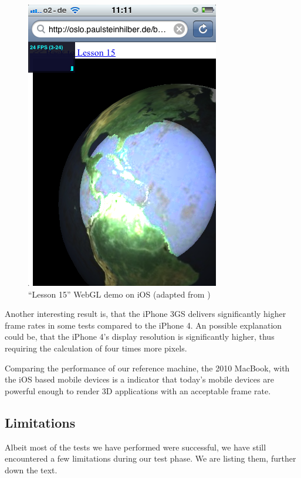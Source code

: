 \documentclass[12pt,journal,compsoc]{IEEEtran}
\begin{document}
\begin{figure}[htb]
	\begin{center}  
    \includegraphics[width=0.8\columnwidth]{grafiken/lesson15_iOS}
      \caption{“Lesson 15” WebGL demo on iOS (adapted from \cite{lesson15})}
      \label{fig:lesson15_iOS}
    \end{center}
\end{figure}

Another interesting result is, that the iPhone 3GS delivers significantly higher frame rates in some tests compared to the iPhone 4. An possible explanation could be, that the iPhone 4’s display resolution is significantly higher, thus requiring the calculation of four times more pixels. 

Comparing the performance of our reference machine, the 2010 MacBook, with the iOS based mobile devices is a indicator that today's mobile devices are powerful enough to render 3D applications with an acceptable frame rate.

\subsection{Limitations}
Albeit most of the tests we have performed were successful, we have still encountered a few limitations during our test phase. We are listing them, further down the text.
\end{document}
